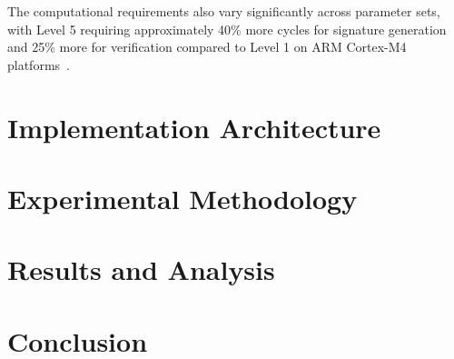 \documentclass[journal=tches,final]{iacrtrans}
\begin{document}
The computational requirements also vary significantly across parameter sets, with Level 5 requiring approximately 40\% more cycles for signature generation and 25\% more for verification compared to Level 1 on ARM Cortex-M4 platforms~\cite{pqm4-benchmarks}.

\section{Implementation Architecture}

\section{Experimental Methodology}

\section{Results and Analysis}

\section{Conclusion}



\end{document}
